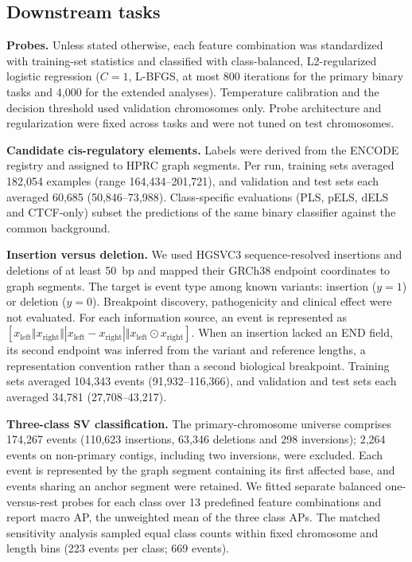 \documentclass[11pt]{article}
\begin{document}
\begin{bibunit}[unsrtnat]
\subsection{Downstream tasks}
\label{sec:tasks}

\textbf{Probes.} Unless stated otherwise, each feature combination was standardized with training-set statistics and classified with class-balanced, L2-regularized logistic regression ($C=1$, L-BFGS, at most 800 iterations for the primary binary tasks and 4,000 for the extended analyses). Temperature calibration and the decision threshold used validation chromosomes only. Probe architecture and regularization were fixed across tasks and were not tuned on test chromosomes.

\textbf{Candidate cis-regulatory elements.} Labels were derived from the ENCODE registry\cite{encode2020registry} and assigned to HPRC graph segments. Per run, training sets averaged 182,054 examples (range 164,434--201,721), and validation and test sets each averaged 60,685 (50,846--73,988). Class-specific evaluations (PLS, pELS, dELS and CTCF-only) subset the predictions of the same binary classifier against the common background.

\textbf{Insertion versus deletion.} We used HGSVC3 sequence-resolved insertions and deletions of at least 50~bp\cite{hgsvc32025} and mapped their GRCh38 endpoint coordinates to graph segments. The target is event type among known variants: insertion ($y=1$) or deletion ($y=0$). Breakpoint discovery, pathogenicity and clinical effect were not evaluated. For each information source, an event is represented as $[x_{\mathrm{left}}\Vert x_{\mathrm{right}}\Vert |x_{\mathrm{left}}-x_{\mathrm{right}}|\Vert x_{\mathrm{left}}\odot x_{\mathrm{right}}]$. When an insertion lacked an END field, its second endpoint was inferred from the variant and reference lengths, a representation convention rather than a second biological breakpoint. Training sets averaged 104,343 events (91,932--116,366), and validation and test sets each averaged 34,781 (27,708--43,217).

\textbf{Three-class SV classification.} The primary-chromosome universe comprises 174,267 events (110,623 insertions, 63,346 deletions and 298 inversions); 2,264 events on non-primary contigs, including two inversions, were excluded. Each event is represented by the graph segment containing its first affected base, and events sharing an anchor segment were retained. We fitted separate balanced one-versus-rest probes for each class over 13 predefined feature combinations and report macro AP, the unweighted mean of the three class APs. The matched sensitivity analysis sampled equal class counts within fixed chromosome and length bins (223 events per class; 669 events).


\end{bibunit}
\end{document}
